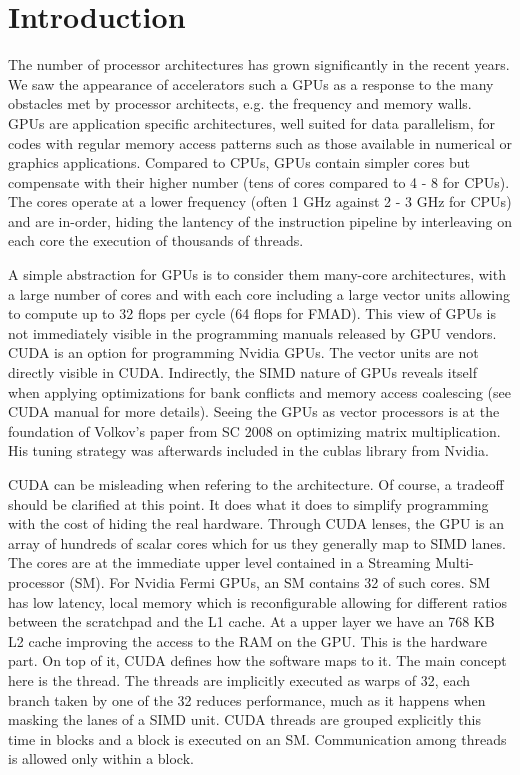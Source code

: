 \section{Introduction}
The number of processor architectures has grown significantly in the recent years. We saw the appearance of accelerators such a GPUs as a response to the many obstacles met by processor architects, e.g. the frequency and memory walls. GPUs are application specific architectures, well suited for data parallelism, for codes with regular memory access patterns such as those available in numerical or graphics applications. Compared to CPUs, GPUs contain simpler cores but compensate with their higher number (tens of cores compared to 4 - 8 for CPUs). The cores operate at a lower frequency (often 1 GHz against 2 - 3 GHz for CPUs) and are in-order, hiding the lantency of the instruction pipeline by interleaving on each core the execution of thousands of threads.

A simple abstraction for GPUs is to consider them many-core architectures, with a large number of cores and with each core including a large vector units allowing to compute up to 32 flops per cycle (64 flops for FMAD). This view of GPUs is not immediately visible in the programming manuals released by GPU vendors. CUDA is an option for programming Nvidia GPUs. The vector units are not directly visible in CUDA. Indirectly, the SIMD nature of GPUs reveals itself when applying optimizations for bank conflicts and memory access coalescing (see CUDA manual for more details). Seeing the GPUs as vector processors is at the foundation of Volkov's paper from SC 2008 on optimizing matrix multiplication. His tuning strategy was afterwards included in the cublas library from Nvidia.

CUDA can be misleading when refering to the architecture. Of course, a tradeoff should be clarified at this point. It does what it does to simplify programming with the cost of hiding the real hardware. Through CUDA lenses, the GPU is an array of hundreds of scalar cores which for us they generally map to SIMD lanes. The cores are at the immediate upper level contained in a Streaming Multi-processor (SM). For Nvidia Fermi GPUs, an SM contains 32 of such cores. SM has low latency, local memory which is reconfigurable allowing for different ratios between the scratchpad and the L1 cache. At a upper layer we have an 768 KB L2 cache improving the access to the RAM on the GPU. This is the hardware part. On top of it, CUDA defines how the software maps to it. The main concept here is the thread. The threads are implicitly executed as warps of 32, each branch taken by one of the 32 reduces performance, much as it happens when masking the lanes of a SIMD unit. CUDA threads are grouped explicitly this time in blocks and a block is executed on an SM. Communication among threads is allowed only within a block.

